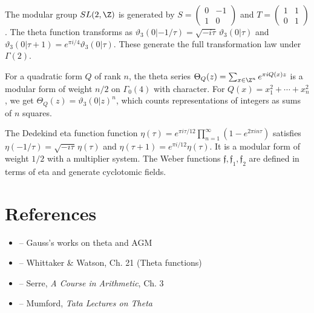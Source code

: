 \begin{solution}
The modular group $SL(2,\Z)$ is generated by $S = \begin{pmatrix} 0 & -1 \\ 1 & 0 \end{pmatrix}$ and $T = \begin{pmatrix} 1 & 1 \\ 0 & 1 \end{pmatrix}$. The theta function transforms as $\vartheta_3(0|-1/\tau) = \sqrt{-i\tau}\,\vartheta_3(0|\tau)$ and $\vartheta_3(0|\tau+1) = e^{\pi i/4}\vartheta_3(0|\tau)$. These generate the full transformation law under $\Gamma(2)$.
\end{solution}

\begin{solution}
For a quadratic form $Q$ of rank $n$, the theta series $\Theta_Q(z) = \sum_{x \in \Z^n} e^{\pi i Q(x) z}$ is a modular form of weight $n/2$ on $\Gamma_0(4)$ with character. For $Q(x) = x_1^2 + \cdots + x_n^2$, we get $\Theta_Q(z) = \vartheta_3(0|z)^n$, which counts representations of integers as sums of $n$ squares.
\end{solution}

\begin{solution}
The Dedekind eta function function $\eta(\tau) = e^{\pi i \tau/12}\prod_{n=1}^{\infty}(1-e^{2\pi i n\tau})$ satisfies $\eta(-1/\tau) = \sqrt{-i\tau}\,\eta(\tau)$ and $\eta(\tau+1) = e^{\pi i/12}\eta(\tau)$. It is a modular form of weight $1/2$ with a multiplier system. The Weber functions $\mathfrak{f}, \mathfrak{f}_1, \mathfrak{f}_2$ are defined in terms of eta and generate cyclotomic fields.
\end{solution}


\section{References}

\begin{itemize}
    \item \cite{gauss-works} -- Gauss's works on theta and AGM
    \item \cite{whittaker-watson} -- Whittaker \& Watson, Ch. 21 (Theta functions)
    \item \cite{serre-modular} -- Serre, \textit{A Course in Arithmetic}, Ch. 3
    \item \cite{mumford-tata} -- Mumford, \textit{Tata Lectures on Theta}
\end{itemize}